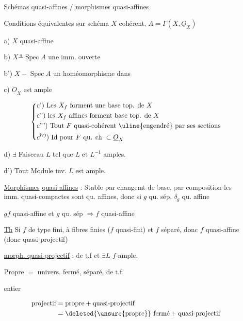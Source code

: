 \uline{Schémas quasi-affines}  / \uline{morphismes quasi-affines}

Conditions équivalentes sur schéma $X$ cohérent, $A=\Gamma(X,\underline O_X)$

a) $X$ quasi-affine

b) $X\overset{u}{\mathrel{-}}\operatorname{Spec}A$ une imm. ouverte

b') $X\mathrel{-}\operatorname{Spec}A$ un homéomorphisme dans

c) $\underline O_X$ est ample

\[
\left\{\begin{aligned}
 &\text{c') Les }X_f\text{ forment une base top. de }X\\
 &\text{c'') les }X_f\text{ affines forment base top. de }X\\
 &\text{c''') Tout } F\text{ quasi-cohérent \uline{engendré} par ses sections}\\
 &c^{\mathrm{iv})})\ \text{Id pour }F\text{ qu. ch }\subset\underline O_X
\end{aligned}\right.
\]

d) $\exists$ Faisceau   $L$ tel que $L$ et $L^{-1}$ amples.

d') Tout Module inv. $L$ est ample.

\uline{Morphismes} \uline{quasi-affines} : Stable par changemt de base, par composition les imm. quasi-compactes sont qu. affines, donc si $g$ qu. sép, $\delta_g$ qu. affine

$gf$ quasi-affine et $g$ qu. sép $\Longrightarrow f$ quasi-affine

\uline{Th} Si $f$ de type fini,  à fibres finies ($f$ quasi-fini) et $f$ séparé, donc $f$ quasi-affine (donc quasi-projectif)

\uline{morph. quasi-projectif} : de t.f et $\exists L$ $f$-ample.

Propre $={}$ univers. fermé, séparé, de t.f.

entier

\[
\begin{aligned}\text{projectif}&=\text{propre}+\text{quasi-projectif}\\
 &=\deleted{\unsure{\text{propre}}}\ \text{fermé}+\text{quasi-projectif}
\end{aligned}
\]

